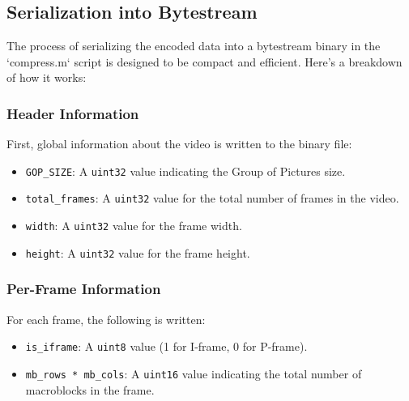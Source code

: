 \documentclass{article}
\begin{document}
\subsection{Serialization into Bytestream}
The process of serializing the encoded data into a bytestream binary in the `compress.m` script is designed to be compact and efficient. Here's a breakdown of how it works:

\subsubsection{Header Information}
First, global information about the video is written to the binary file:
\begin{itemize}
    \item \texttt{GOP\_SIZE}: A \texttt{uint32} value indicating the Group of Pictures size.
    \item \texttt{total\_frames}: A \texttt{uint32} value for the total number of frames in the video.
    \item \texttt{width}: A \texttt{uint32} value for the frame width.
    \item \texttt{height}: A \texttt{uint32} value for the frame height.
\end{itemize}

\subsubsection{Per-Frame Information}
For each frame, the following is written:
\begin{itemize}
    \item \texttt{is\_iframe}: A \texttt{uint8} value (1 for I-frame, 0 for P-frame).
    \item \texttt{mb\_rows * mb\_cols}: A \texttt{uint16} value indicating the total number of macroblocks in the frame.
\end{itemize}
\end{document}
